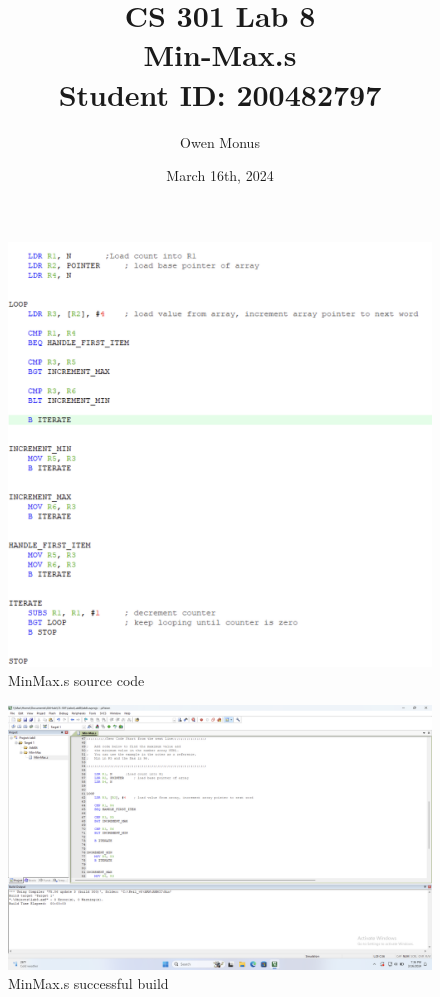 \documentclass{article}
\begin{document}
\title{CS 301 Lab 8\\[0.5cm]\large Min-Max.s\\[0.5cm]\large Student ID: 200482797}
\author{Owen Monus}
\date{March 16th, 2024}

\maketitle

\pagebreak

\begin{figure}
\caption{MinMax.s source code}
\includegraphics[width=\textwidth]{../../Images/minMax_source_code.png}
\end{figure}

\begin{figure}
\caption{MinMax.s successful build}
\includegraphics[width=\textwidth]{../../Images/minMax_print_screen.png}
\end{figure}
\end{document}
